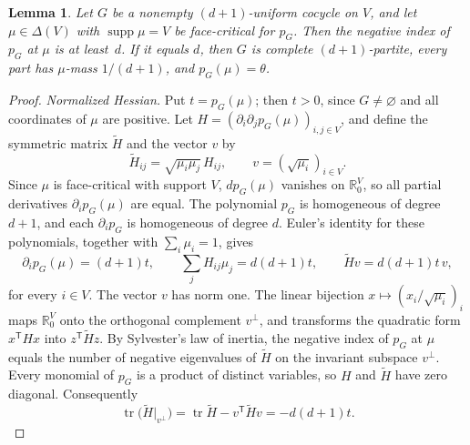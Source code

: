 \documentclass[11pt]{article}
\newtheorem{lemma}[theorem]{Lemma}
\theoremstyle{definition}
\numberwithin{equation}{section}
\newcommand{\R}{\mathbb R}
\DeclareMathOperator{\supp}{supp}
\DeclareMathOperator{\tr}{tr}
\begin{document}
\begin{lemma}\label{lem:spectral}
Let $G$ be a nonempty $(d+1)$-uniform cocycle on $V$, and let $\mu\in\Delta(V)$ with $\supp\mu=V$ be face-critical for $p_G$. Then the negative index of $p_G$ at $\mu$ is at least~$d$. If it equals $d$, then $G$ is complete $(d+1)$-partite, every part has $\mu$-mass $1/(d+1)$, and $p_G(\mu)=\theta$.
\end{lemma}
\begin{proof}
\emph{Normalized Hessian.} Put $t=p_G(\mu)$; then $t>0$, since $G\ne\varnothing$ and all coordinates of $\mu$ are positive. Let $H=(\partial_i\partial_jp_G(\mu))_{i,j\in V}$, and define the symmetric matrix $\widetilde H$ and the vector $v$ by
\begin{equation*}
 \widetilde H_{ij}=\sqrt{\mu_i\mu_j}\,H_{ij},\qquad v=(\sqrt{\mu_i})_{i\in V}.
\end{equation*}
Since $\mu$ is face-critical with support $V$, $dp_G(\mu)$ vanishes on $\R^V_0$, so all partial derivatives $\partial_ip_G(\mu)$ are equal. The polynomial $p_G$ is homogeneous of degree $d+1$, and each $\partial_ip_G$ is homogeneous of degree $d$. Euler's identity for these polynomials, together with $\sum_i\mu_i=1$, gives
\begin{equation}\label{eq:stationary}
 \partial_ip_G(\mu)=(d+1)t,\qquad
 \sum_jH_{ij}\mu_j=d(d+1)t,\qquad
 \widetilde Hv=d(d+1)t\,v,
\end{equation}
for every $i\in V$. The vector $v$ has norm one. The linear bijection $x\mapsto(x_i/\sqrt{\mu_i})_i$ maps $\R^V_0$ onto the orthogonal complement $v^\perp$, and transforms the quadratic form $x^{\mathsf T}Hx$ into $z^{\mathsf T}\widetilde Hz$. By Sylvester's law of inertia, the negative index of $p_G$ at $\mu$ equals the number of negative eigenvalues of $\widetilde H$ on the invariant subspace $v^\perp$. Every monomial of $p_G$ is a product of distinct variables, so $H$ and $\widetilde H$ have zero diagonal. Consequently
\begin{equation}\label{eq:trace}
 \tr\bigl(\widetilde H|_{v^\perp}\bigr)=\tr\widetilde H-v^{\mathsf T}\widetilde Hv=-d(d+1)t.
\end{equation}


\end{proof}
\end{document}
